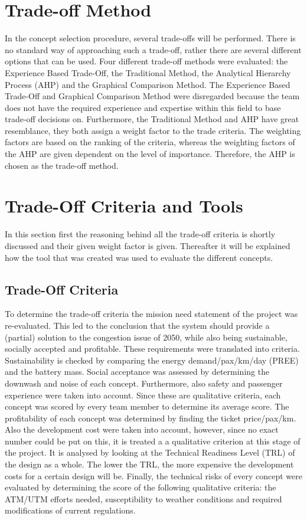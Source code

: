 \section{Trade-off Method}
In the concept selection procedure, several trade-offs will be performed. There is no standard way of approaching such a trade-off, rather there are several different options that can be used. Four different trade-off methods were evaluated: the Experience Based Trade-Off, the Traditional Method, the Analytical Hierarchy Process (AHP) and the Graphical Comparison Method. The Experience Based Trade-Off and Graphical Comparison Method were disregarded because the team does not have the required experience and expertise within this field to base trade-off decisions on. Furthermore, the Traditional Method and AHP have great resemblance, they both assign a weight factor to the trade criteria. The weighting factors are based on the ranking of the criteria, whereas the weighting factors of the AHP are given dependent on the level of importance. Therefore, the AHP is chosen as the trade-off method. 


\section{Trade-Off Criteria and Tools}
In this section first the reasoning behind all the trade-off criteria is shortly discussed and their given weight factor is given. Thereafter it will be explained how the tool that was created was used to evaluate the different concepts. 

\subsection{Trade-Off Criteria}
To determine the trade-off criteria the mission need statement of the project was re-evaluated. This led to the conclusion that the system should provide a (partial) solution to the congestion issue of 2050, while also being sustainable, socially accepted and profitable. These requirements were translated into criteria. Sustainability is checked by comparing the energy demand/pax/km/day (PREE) and the battery mass. Social acceptance was assessed by determining the downwash and noise of each concept. Furthermore, also safety and passenger experience were taken into account. Since these are qualitative criteria, each concept was scored by every team member to determine its average score. The profitability of each concept was determined by finding the ticket price/pax/km. Also the development cost were taken into account, however, since no exact number could be put on this, it is treated a a qualitative criterion at this stage of the project. It is analysed by looking at the Technical Readiness Level (TRL) of the design as a whole. The lower the TRL, the more expensive the development costs for a certain design will be. Finally, the technical risks of every concept were evaluated by determining the score of the following qualitative criteria: the ATM/UTM efforts needed, susceptibility to weather conditions and required modifications of current regulations.

